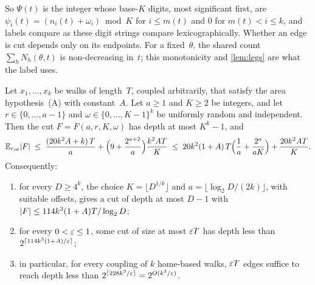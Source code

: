 So $\Psi(t)$ is the integer whose base-$K$ digits, most significant first, are $\psi_i(t)=(n_i(t)+\omega_i)\bmod K$
for $i\le m(t)$ and $0$ for $m(t)<i\le k$, and labels compare as these digit strings compare lexicographically.
Whether an edge is cut depends only on its endpoints. For a fixed~$\theta$, the shared count $\sum_hN_h(\theta,t)$ is
non-decreasing in~$t$; this monotonicity and \cref{lem:legs} are what the label uses.

\begin{theorem}\label{thm:B}
\notformalized
Let $x_1,\dots,x_k$ be walks of length~$T$, coupled arbitrarily, that satisfy the area hypothesis~(A) with
constant~$A$. Let $a\ge1$ and $K\ge2$ be integers, and let $r\in\{0,\dots,a-1\}$ and $\omega\in\{0,\dots,K-1\}^k$ be
uniformly random and independent. Then the cut $F=F(a,r,K,\omega)$ has depth at most $K^k-1$, and
\begin{equation}\label{eq:dec-B}
  \mathbb E_{r,\omega}\lvert F \rvert\;\le\;\frac{(20k^2A+k)\,T}{a}+\Bigl(9+\frac{2^{a+2}}a\Bigr)\frac{k^2AT}{K}
  \;\le\;20k^2(1+A)\,T\Bigl(\frac1a+\frac{2^a}{aK}\Bigr)+\frac{20k^2AT}{K}.
\end{equation}
Consequently:
\begin{enumerate}[label=(\alph*)]
\item for every $D\ge4^k$, the choice $K=\lfloor D^{1/k}\rfloor$ and $a=\lfloor\log_2D/(2k)\rfloor$, with suitable
offsets, gives a cut of depth at most $D-1$ with $\lvert F \rvert\le114k^3(1+A)T/\log_2D$;
\item for every $0<\varepsilon\le1$, some cut of size at most $\varepsilon T$ has depth less than
$2^{\lceil114k^3(1+A)/\varepsilon\rceil}$;
\item in particular, for every coupling of $k$ home-based walks, $\varepsilon T$ edges suffice to reach depth less than
$2^{\lceil228k^3/\varepsilon\rceil}=2^{O(k^3/\varepsilon)}$.
\end{enumerate}
\end{theorem}

